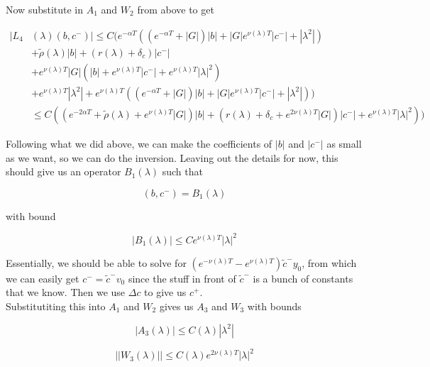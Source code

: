 \documentclass[12pt]{article}
\begin{document}
\begin{enumerate}
Now substitute in $A_1$ and $W_2$ from above to get

\begin{align*}
|L_4&(\lambda)(b, c^-)| \leq C( e^{-\alpha T}( (e^{-\alpha T} + |G|)|b| + |G|e^{\nu(\lambda)T}|c^-| + |\lambda^2|) \\ 
&+ \tilde{\rho}(\lambda)|b| + 
(r(\lambda) + \delta_c )|c^-| \\
&+ e^{\nu(\lambda)T} |G|(|b| + e^{\nu(\lambda)T}|c^-| + e^{\nu(\lambda)T}|\lambda|^2)\\
&+ e^{\nu(\lambda)T}|\lambda^2| + e^{\nu(\lambda)T}( (e^{-\alpha T} + |G|)|b| + |G|e^{\nu(\lambda)T}|c^-| + |\lambda^2|)) \\
&\leq C( ( e^{-2\alpha T} + \tilde{\rho}(\lambda) + e^{\nu(\lambda)T} |G|)|b| +
(r(\lambda) + \delta_c + e^{2\nu(\lambda)T} |G| )|c^-| +  e^{\nu(\lambda)T}|\lambda|^2) )
\end{align*}

Following what we did above, we can make the coefficients of $|b|$ and $|c^-|$ as small as we want, so we can do the inversion. Leaving out the details for now, this should give us an operator $B_1(\lambda)$ such that

\[
(b, c^-) = B_1(\lambda)
\]

with bound

\[
|B_1(\lambda)| \leq C e^{\nu(\lambda)T}|\lambda|^2
\]

Essentially, we should be able to solve for $(e^{-\nu(\lambda)T} - e^{\nu(\lambda)T}) \tilde{c}^- y_0$, from which we can easily get $c^- = \tilde{c}^- v_0$ since the stuff in front of $\tilde{c}^-$ is a bunch of constants that we know. Then we use $\Delta c$ to give us $c^+$.\\

Substitutiting this into $A_1$ and $W_2$ gives us $A_3$ and $W_3$ with bounds

\[
|A_3(\lambda)| \leq C(\lambda)|\lambda^2|
\]

\[
||W_3(\lambda)|| \leq C(\lambda) e^{2 \nu(\lambda)T}|\lambda|^2
\]


\end{enumerate}
\end{document}
